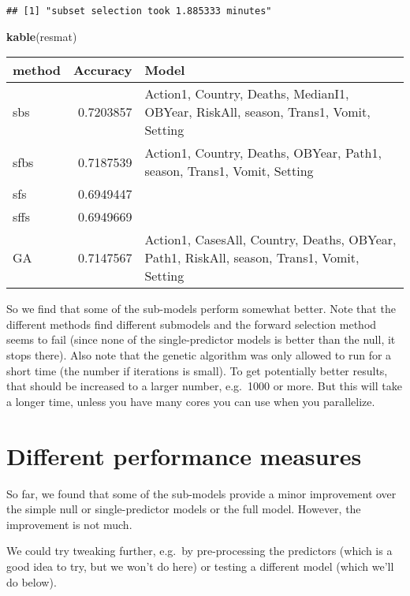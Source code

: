 \documentclass[]{article}
\newenvironment{Shaded}{\begin{snugshade}}{\end{snugshade}}
\newcommand{\KeywordTok}[1]{\textcolor[rgb]{0.13,0.29,0.53}{\textbf{#1}}}
\newcommand{\NormalTok}[1]{#1}
\begin{document}
\begin{verbatim}
## [1] "subset selection took 1.885333 minutes"
\end{verbatim}

\begin{Shaded}
\begin{Highlighting}[]
\KeywordTok{kable}\NormalTok{(resmat)}
\end{Highlighting}
\end{Shaded}

\begin{longtable}[]{@{}lrl@{}}
\toprule
method & Accuracy & Model\tabularnewline
\midrule
\endhead
sbs & 0.7203857 & Action1, Country, Deaths, MedianI1, OBYear, RiskAll,
season, Trans1, Vomit, Setting\tabularnewline
sfbs & 0.7187539 & Action1, Country, Deaths, OBYear, Path1, season,
Trans1, Vomit, Setting\tabularnewline
sfs & 0.6949447 &\tabularnewline
sffs & 0.6949669 &\tabularnewline
GA & 0.7147567 & Action1, CasesAll, Country, Deaths, OBYear, Path1,
RiskAll, season, Trans1, Vomit, Setting\tabularnewline
\bottomrule
\end{longtable}

So we find that some of the sub-models perform somewhat better. Note
that the different methods find different submodels and the forward
selection method seems to fail (since none of the single-predictor
models is better than the null, it stops there). Also note that the
genetic algorithm was only allowed to run for a short time (the number
if iterations is small). To get potentially better results, that should
be increased to a larger number, e.g.~1000 or more. But this will take a
longer time, unless you have many cores you can use when you
parallelize.

\hypertarget{different-performance-measures}{%
\section{Different performance
measures}\label{different-performance-measures}}

So far, we found that some of the sub-models provide a minor improvement
over the simple null or single-predictor models or the full model.
However, the improvement is not much.

We could try tweaking further, e.g.~by pre-processing the predictors
(which is a good idea to try, but we won't do here) or testing a
different model (which we'll do below).
\end{document}
